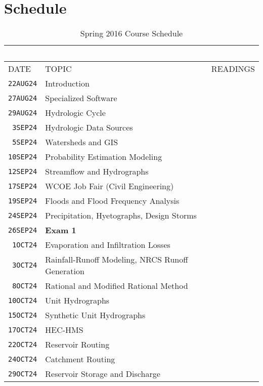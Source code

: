 \documentclass[12pt]{article}
\begin{document}
\section*{Schedule}
\begin{table}[ht!]
   \centering
   \caption{Spring 2016 Course Schedule}
   \begin{tabular}{p{0.5in}p{3in}p{2.5in}} 
   ~ & ~ & ~  \\
\hline
\hline
DATE & TOPIC & READINGS  \\
\hline
\texttt{22AUG24} & Introduction &   \\ %
\texttt{27AUG24} & Specialized Software &  \\ %
\texttt{29AUG24} & Hydrologic Cycle  &  \\ %
\texttt{~3SEP24} & Hydrologic Data Sources &\\ %
\texttt{~5SEP24} & Watersheds and GIS &  \\ %
\texttt{10SEP24} & Probability Estimation Modeling &  \\ %
\texttt{12SEP24} & Streamflow and Hydrographs &  \\ %
\texttt{17SEP24} & WCOE Job Fair (Civil Engineering)   &   \\ %
\texttt{19SEP24} & Floods and Flood Frequency Analysis &  \\ %
\texttt{24SEP24} & Precipitation, Hyetographs, Design Storms &   \\  %
\texttt{26SEP24} & \textbf{Exam 1} &  \\ %
\texttt{~1OCT24} & Evaporation and Infiltration Losses &  \\ %
\texttt{~3OCT24} & Rainfall-Runoff Modeling, NRCS Runoff Generation &  \\ %
\texttt{~8OCT24} & Rational and Modified Rational Method &  \\  %
\texttt{10OCT24} & Unit Hydrographs & \\ %
\texttt{15OCT24} & Synthetic Unit Hydrographs &    \\ %
\texttt{17OCT24} & HEC-HMS  & \\ %
\texttt{22OCT24} & Reservoir Routing &   \\ %
\texttt{24OCT24} & Catchment Routing & \\ %
\texttt{29OCT24} & Reservoir Storage and Discharge & \\ %

\end{tabular}
\end{table}
\end{document}
